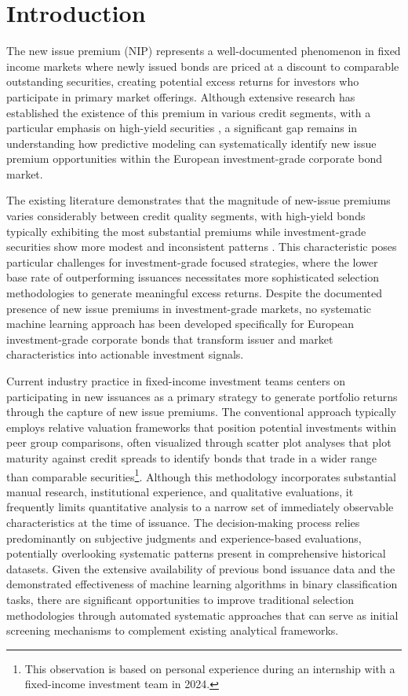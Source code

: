 \chapter{Introduction}
\label{introduction}

The new issue premium (NIP) represents a well-documented phenomenon in fixed income markets where newly issued bonds are priced at a discount to comparable outstanding securities, creating potential excess returns for investors who participate in primary market offerings. Although extensive research has established the existence of this premium in various credit segments, with a particular emphasis on high-yield securities \parencite{Geerts2022PredictingYield}, a significant gap remains in understanding how predictive modeling can systematically identify new issue premium opportunities within the European investment-grade corporate bond market.

The existing literature demonstrates that the magnitude of new-issue premiums varies considerably between credit quality segments, with high-yield bonds typically exhibiting the most substantial premiums while investment-grade securities show more modest and inconsistent patterns \parencite{Traczyk2024NewFactor}. This characteristic poses particular challenges for investment-grade focused strategies, where the lower base rate of outperforming issuances necessitates more sophisticated selection methodologies to generate meaningful excess returns. Despite the documented presence of new issue premiums in investment-grade markets, no systematic machine learning approach has been developed specifically for European investment-grade corporate bonds that transform issuer and market characteristics into actionable investment signals.

Current industry practice in fixed-income investment teams centers on participating in new issuances as a primary strategy to generate portfolio returns through the capture of new issue premiums. The conventional approach typically employs relative valuation frameworks that position potential investments within peer group comparisons, often visualized through scatter plot analyses that plot maturity against credit spreads to identify bonds that trade in a wider range than comparable securities\footnote{This observation is based on personal experience during an internship with a fixed-income investment team in 2024.}. Although this methodology incorporates substantial manual research, institutional experience, and qualitative evaluations, it frequently limits quantitative analysis to a narrow set of immediately observable characteristics at the time of issuance. The decision-making process relies predominantly on subjective judgments and experience-based evaluations, potentially overlooking systematic patterns present in comprehensive historical datasets. Given the extensive availability of previous bond issuance data and the demonstrated effectiveness of machine learning algorithms in binary classification tasks, there are significant opportunities to improve traditional selection methodologies through automated systematic approaches that can serve as initial screening mechanisms to complement existing analytical frameworks.

